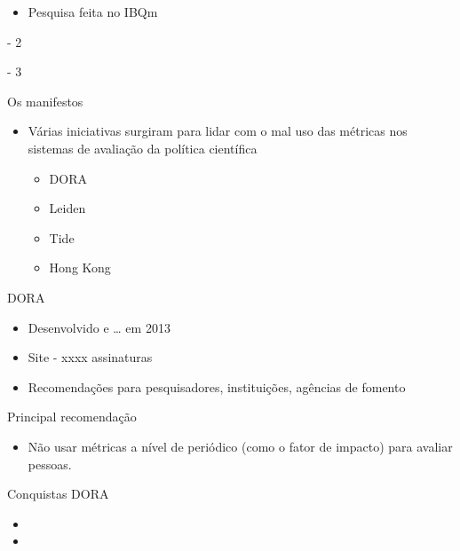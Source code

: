 \documentclass[bigger]{beamer}
\begin{document}
\begin{frame}[label={sec:orgbb71e90}]{\cite{demeis2003}}
\begin{itemize}
\item Pesquisa feita no IBQm
\end{itemize}
\end{frame}


\begin{frame}[label={sec:org6991427}]{\cite{demeis2003} - 2}
\end{frame}

\begin{frame}[label={sec:orgcc023df}]{\cite{demeis2003} - 3}
\end{frame}


\begin{frame}[label={sec:org7850a3b}]{Os manifestos}
\begin{itemize}
\item Várias iniciativas surgiram para lidar com o mal uso das métricas nos sistemas de avaliação da política científica
\begin{itemize}
\item DORA
\item Leiden
\item Tide
\item Hong Kong
\end{itemize}
\end{itemize}
\end{frame}

\begin{frame}[label={sec:org5baed58}]{DORA}
\begin{itemize}
\item Desenvolvido e \ldots{} em 2013
\item Site - xxxx assinaturas
\item Recomendações para pesquisadores, instituições, agências de fomento
\end{itemize}
\end{frame}

\begin{frame}[label={sec:orgf1793f0}]{Principal recomendação}
\begin{itemize}
\item Não usar métricas a nível de periódico (como o fator de impacto) para avaliar pessoas.
\end{itemize}
\end{frame}

\begin{frame}[label={sec:org8ba643c}]{Conquistas DORA \parencite{schmid2017}}
\begin{itemize}
\item 

\item 
\end{itemize}
\end{frame}
\end{document}
